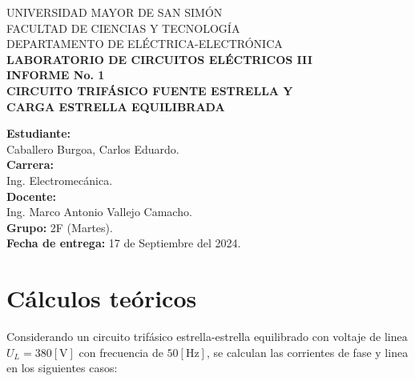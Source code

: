 \documentclass[letter,11pt]{article}
\begin{document}
\begin{titlepage}
    \begin{center}
        {\Large UNIVERSIDAD MAYOR DE SAN SIMÓN}\\
        \vspace*{0.15cm}
        {\large FACULTAD DE CIENCIAS Y TECNOLOGÍA}\\
        \vspace*{0.10cm}
        DEPARTAMENTO DE ELÉCTRICA-ELECTRÓNICA\\
        \vspace*{3.0cm}
        {\Large \textbf{LABORATORIO DE CIRCUITOS ELÉCTRICOS III}}\\
        \vspace*{0.3cm}
        {\Large \textbf{INFORME No. 1}}\\
        \vspace*{3.5cm}
        {\Large \textbf{CIRCUITO TRIFÁSICO FUENTE ESTRELLA Y \\
        CARGA ESTRELLA EQUILIBRADA}}\\
    \end{center}

    \vspace*{5.8cm}
    \leftskip=7.95cm
    \noindent
    \textbf{Estudiante:}\\
    Caballero Burgoa, Carlos Eduardo.\\
    \newline
    \textbf{Carrera:}\\
    Ing. Electromecánica.\\
    \newline
    \textbf{Docente:}\\
    Ing. Marco Antonio Vallejo Camacho.\\
    \newline
    \textbf{Grupo:} 2F (Martes).\\
\textbf{Fecha de entrega:} 17 de Septiembre del 2024.\\
\end{titlepage}

\section{Cálculos teóricos}
Considerando un circuito trifásico estrella-estrella equilibrado con voltaje de
linea $U_L=380[\text{V}]$ con frecuencia de $50[\text{Hz}]$, se calculan las
corrientes de fase y linea en los siguientes casos:

\vspace{0.6cm}
\end{document}
